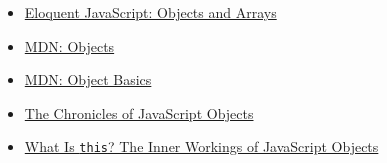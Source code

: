 \begin{itemize}[leftmargin=*]
    \item \href{https://eloquentjavascript.net/04_data.html}{Eloquent JavaScript: Objects and Arrays}
    \item \href{https://developer.mozilla.org/en-US/docs/Web/JavaScript/Reference/Global_Objects/Object}{MDN: Objects}
    \item \href{https://developer.mozilla.org/en-US/docs/Learn/JavaScript/Objects/Basics}{MDN: Object Basics}
    \item \href{https://blog.bitsrc.io/the-chronicles-of-javascript-objects-2d6b9205cd66}{The Chronicles of JavaScript Objects}
    \item \href{https://medium.com/javascript-scene/what-is-this-the-inner-workings-of-javascript-objects-d397bfa0708a}{What Is \texttt{this}? The Inner Workings of JavaScript Objects}
\end{itemize}
